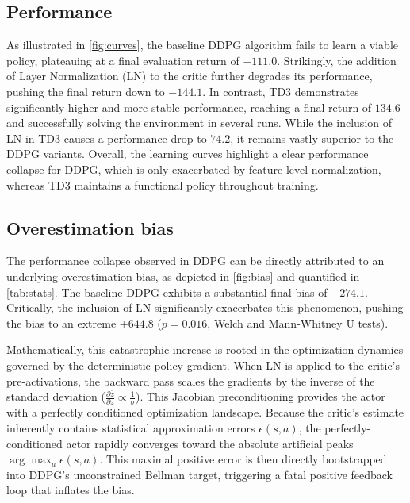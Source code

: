 \documentclass[10pt,a4paper]{article}
\begin{document}
\subsection{Performance}

As illustrated in \cref{fig:curves}, the baseline DDPG algorithm fails to learn a viable policy, plateauing at a final evaluation return of $-111.0$. Strikingly, the addition of Layer Normalization (LN) to the critic further degrades its performance, pushing the final return down to $-144.1$. In contrast, TD3 demonstrates significantly higher and more stable performance, reaching a final return of $134.6$ and successfully solving the environment in several runs. While the inclusion of LN in TD3 causes a performance drop to $74.2$, it remains vastly superior to the DDPG variants. Overall, the learning curves highlight a clear performance collapse for DDPG, which is only exacerbated by feature-level normalization, whereas TD3 maintains a functional policy throughout training.

\subsection{Overestimation bias}
The performance collapse observed in DDPG can be directly attributed to an underlying overestimation bias, as depicted in \cref{fig:bias} and quantified in \cref{tab:stats}. The baseline DDPG exhibits a substantial final bias of $+274.1$. Critically, the inclusion of LN significantly exacerbates this phenomenon, pushing the bias to an extreme $+644.8$ ($p = 0.016$, Welch and Mann-Whitney U tests). 

Mathematically, this catastrophic increase is rooted in the optimization dynamics governed by the deterministic policy gradient. When LN is applied to the critic's pre-activations, the backward pass scales the gradients by the inverse of the standard deviation ($\frac{\partial \bar{z}}{\partial z} \propto \frac{1}{\sigma}$). This Jacobian preconditioning provides the actor with a perfectly conditioned optimization landscape. Because the critic's estimate inherently contains statistical approximation errors $\epsilon(s,a)$, the perfectly-conditioned actor rapidly converges toward the absolute artificial peaks $\arg\max_a \epsilon(s,a)$. This maximal positive error is then directly bootstrapped into DDPG's unconstrained Bellman target, triggering a fatal positive feedback loop that inflates the bias.
\end{document}
